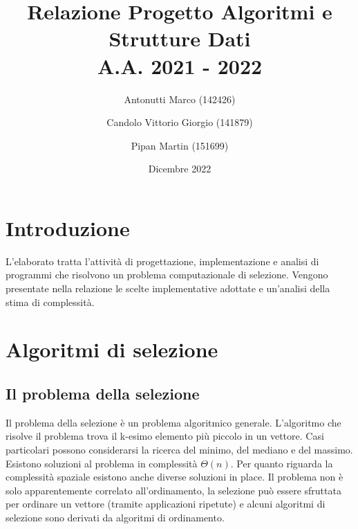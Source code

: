 \documentclass{article}
\title{Relazione Progetto Algoritmi e Strutture Dati \\ A.A. 2021 - 2022}
\author{Antonutti Marco (142426)
        \and Candolo Vittorio Giorgio (141879)
        \and Pipan Martin (151699)}
\date{Dicembre 2022}
\begin{document}
\maketitle

\newpage
\renewcommand{\contentsname}{Indice}
\tableofcontents

\newpage

\section{Introduzione}
L'elaborato tratta l'attività di progettazione, implementazione e analisi di programmi che risolvono un problema computazionale di selezione.
\newline
\newline
Vengono presentate nella relazione le scelte implementative adottate e un'analisi della stima di complessità.

\newpage

\section{Algoritmi di selezione}

\subsection{Il problema della selezione}
Il problema della selezione è un problema algoritmico generale.
\newline
\newline
L'algoritmo che risolve il problema trova il k-esimo elemento più piccolo in un vettore.
\newline
Casi particolari possono considerarsi la ricerca del minimo, del mediano e del massimo.
\newline
\newline
Esistono soluzioni al problema in complessità $\Theta(n)$.
\newline
Per quanto riguarda la complessità spaziale esistono anche diverse soluzioni in place.
\newline
\newline
Il problema non è solo apparentemente correlato all'ordinamento, la selezione può essere sfruttata per ordinare un vettore (tramite applicazioni ripetute) e alcuni algoritmi di selezione sono derivati da algoritmi di ordinamento.
\end{document}
